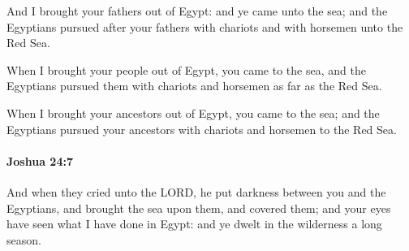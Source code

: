 			\begin{versebox}
					\item[BHS] 
					\item[ASV] And I brought your fathers out of Egypt: and ye came unto the sea; and the Egyptians pursued after your fathers with chariots and with horsemen unto the Red Sea.
					\item[NIV] When I brought your people out of Egypt, you came to the sea, and the Egyptians pursued them with chariots and horsemen as far as the Red Sea.
					\item[NRSV] When I brought your ancestors out of Egypt, you came to the sea; and the Egyptians pursued your ancestors with chariots and horsemen to the Red Sea.
			\end{versebox}

		\paragraph{Joshua 24:7} %
			\label{JOSHUA-24-7}

			And when they cried unto the LORD, he put darkness between you and the Egyptians, and brought the sea upon them, and covered them; and your eyes have seen what I have done in Egypt: and ye dwelt in the wilderness a long season.

